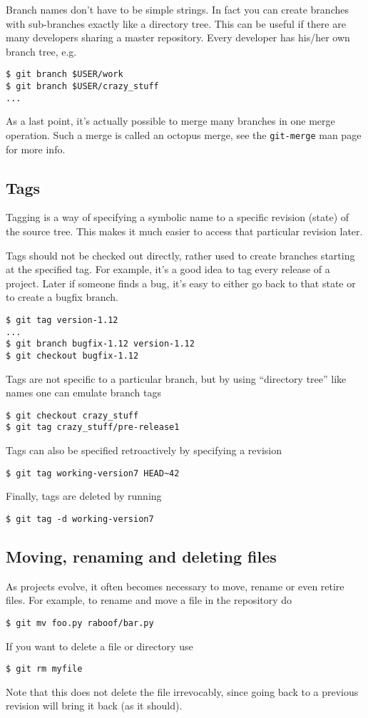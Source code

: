 \documentclass[a4paper,10pt]{article}
\begin{document}
Branch names don't have to be simple strings. In fact you can create branches
with sub-branches exactly like a directory tree. This can be useful if there
are many developers sharing a master repository. Every developer has
his/her own branch tree, e.g.
\begin{verbatim}
$ git branch $USER/work
$ git branch $USER/crazy_stuff
...
\end{verbatim}

As a last point, it's actually possible to merge many branches in one merge
operation.  Such a merge is called an octopus merge, see the
\texttt{git-merge} man page for more info.

\subsection{Tags}
Tagging is a way of specifying a symbolic name to a specific revision (state) 
of the source tree. This makes it much easier to access that particular
revision later. 

Tags should not be checked out directly, rather used to create branches
starting at the specified tag.
For example, it's a good idea to tag every release of a
project. Later if someone finds a bug, it's easy to either go back to that
state or to create a bugfix branch.
\begin{verbatim}
$ git tag version-1.12
...
$ git branch bugfix-1.12 version-1.12
$ git checkout bugfix-1.12
\end{verbatim}
Tags are not specific to a particular branch, but by using
``directory tree'' like names one can emulate branch tags
\begin{verbatim}
$ git checkout crazy_stuff
$ git tag crazy_stuff/pre-release1
\end{verbatim}
Tags can also be specified retroactively by specifying a revision
\begin{verbatim}
$ git tag working-version7 HEAD~42
\end{verbatim}
Finally, tags are deleted by running
\begin{verbatim}
$ git tag -d working-version7 
\end{verbatim}

\subsection{Moving, renaming and deleting files}
As projects evolve, it often becomes necessary to move, rename or even retire 
files. For example, to rename and move a file in the repository do 
\begin{verbatim}
$ git mv foo.py raboof/bar.py
\end{verbatim}
If you want to delete a file or directory use
\begin{verbatim}
$ git rm myfile
\end{verbatim}
Note that this does not delete the file irrevocably, since going back to a
previous revision will bring it back (as it should).
\end{document}
